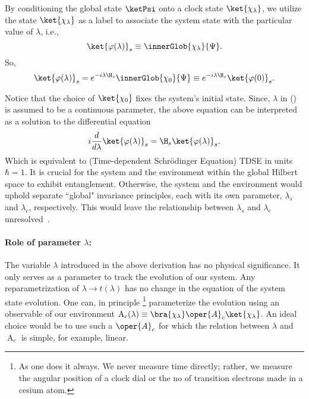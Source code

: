 By conditioning the global state \(\ketPsi\) onto a clock state \(\ket{\chi_\lambda}\),
we utilize the state \(\ket{\chi_\lambda}\) as a label to associate the system state with the particular value of \(\lambda\), i.e., 
\begin{equation}
    \ket{\varphi(\lambda)}_s \equiv \innerGlob{\chi_\lambda}{\Psi}.
\end{equation}
So, 
\begin{equation}
\label{eq:nonint_sys_evol}
    \ket{\varphi(\lambda)}_s = e^{-i\lambda \H_s} \innerGlob{\chi_0}{\Psi} \equiv e^{-i\lambda \H_s}\ket{\varphi(0)}_s.
\end{equation}

Notice that the choice of \(\ket{\chi_0}\) fixes the system's initial state.
Since, \(\lambda\) in () is assumed to be a continuous 
 parameter, the above equation can be interpreted as a solution to the differential equation
\begin{equation}
    i \dfrac{d}{d\lambda} \ket{\varphi(\lambda)}_s = \H_s \ket{\varphi(\lambda)}_s.
\end{equation}
Which is equivalent to (Time-dependent Schr\"odinger Equation) TDSE in units 
\(\hbar = 1\). It is crucial for the system and the environment within the global Hilbert space to exhibit entanglement. Otherwise, the system and the environment would uphold separate ``global" invariance principles, each with its own parameter, \(\lambda_s\) and \(\lambda_c\), respectively. This would leave the relationship between \(\lambda_s\) and \(\lambda_c\) unresolved~\cite{Gemsheim:2023izg}.

\paragraph{Role of parameter \(\lambda\):} The variable \(\lambda\) introduced 
in the above derivation has no physical significance. It only serves as a parameter
to track the evolution of our system. Any reparametrization of \(\lambda \to t(\lambda)\) 
has no change in the equation of the system state evolution. One can, in principle 
\footnote{As one does it always. We never measure time directly; rather, we measure
the angular position of a clock dial or the no of transition electrons made in a cesium atom.}
 parameterize the evolution using an observable of our environment 
 \(\operatorname{A}_c(\lambda)\equiv \bra{\chi_\lambda}\oper{A}_c\ket{\chi_\lambda}\). 
 An ideal choice would be to use such a $\oper{A}_c$ for which the relation between $\lambda $ and $\operatorname{A}_c$ is simple, for example, linear.

